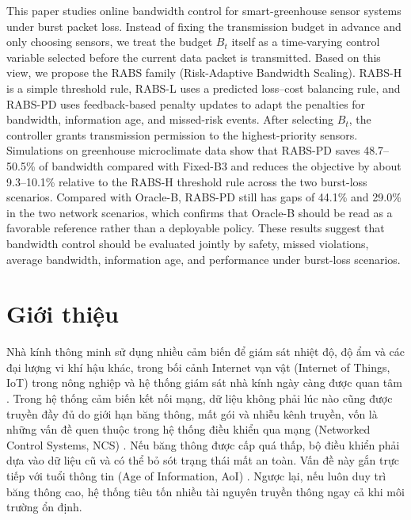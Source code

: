 \documentclass[10pt]{article}
\begin{document}
\begin{enabstract}
This paper studies online bandwidth control for smart-greenhouse sensor systems under burst packet loss. Instead of fixing the transmission budget in advance and only choosing sensors, we treat the budget $B_t$ itself as a time-varying control variable selected before the current data packet is transmitted. Based on this view, we propose the RABS family (Risk-Adaptive Bandwidth Scaling). RABS-H is a simple threshold rule, RABS-L uses a predicted loss--cost balancing rule, and RABS-PD uses feedback-based penalty updates to adapt the penalties for bandwidth, information age, and missed-risk events. After selecting $B_t$, the controller grants transmission permission to the highest-priority sensors. Simulations on greenhouse microclimate data show that RABS-PD saves 48.7--50.5\% of bandwidth compared with Fixed-B3 and reduces the objective by about 9.3--10.1\% relative to the RABS-H threshold rule across the two burst-loss scenarios. Compared with Oracle-B, RABS-PD still has gaps of 44.1\% and 29.0\% in the two network scenarios, which confirms that Oracle-B should be read as a favorable reference rather than a deployable policy. These results suggest that bandwidth control should be evaluated jointly by safety, missed violations, average bandwidth, information age, and performance under burst-loss scenarios.
\end{enabstract}

\section{Giới thiệu}
Nhà kính thông minh sử dụng nhiều cảm biến để giám sát nhiệt độ, độ ẩm và các đại lượng vi khí hậu khác, trong bối cảnh Internet vạn vật (Internet of Things, IoT) trong nông nghiệp và hệ thống giám sát nhà kính ngày càng được quan tâm \cite{ayaz2019iotagriculture,shamshiri2018greenhouse,bersani2022greenhouseiot}. Trong hệ thống cảm biến kết nối mạng, dữ liệu không phải lúc nào cũng được truyền đầy đủ do giới hạn băng thông, mất gói và nhiễu kênh truyền, vốn là những vấn đề quen thuộc trong hệ thống điều khiển qua mạng (Networked Control Systems, NCS) \cite{hespanha2007survey,park2018wirelessncs,lu2023codesign}. Nếu băng thông được cấp quá thấp, bộ điều khiển phải dựa vào dữ liệu cũ và có thể bỏ sót trạng thái mất an toàn. Vấn đề này gắn trực tiếp với tuổi thông tin (Age of Information, AoI) \cite{kaul2012realtime,sun2017update,ayan2019aoi}. Ngược lại, nếu luôn duy trì băng thông cao, hệ thống tiêu tốn nhiều tài nguyên truyền thông ngay cả khi môi trường ổn định.
\end{document}
